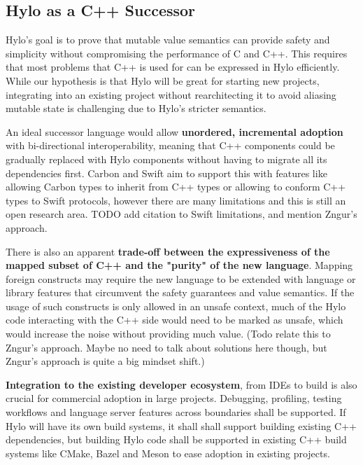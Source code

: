 \subsection{Hylo as a C++ Successor}
Hylo's goal is to prove that mutable value semantics can provide safety and simplicity without compromising the performance of C and C++\cite{hylo-lang}. This requires that most problems that C++ is used for can be expressed in Hylo efficiently. While our hypothesis is that Hylo will be great for starting new projects, integrating into an existing project without rearchitecting it to avoid aliasing mutable state is challenging  due to Hylo's stricter semantics.

An ideal successor language would allow \textbf{unordered, incremental adoption} with bi-directional interoperability\cite{requirements-for-cpp-successor-languages}, meaning that C++ components could be gradually replaced with Hylo components without having to migrate all its dependencies first. Carbon and Swift aim to support this with features like allowing Carbon types to inherit from C++ types\cite{carbon-interop-goals} or allowing to conform C++ types to Swift protocols\cite{swift-cpp-posthoc-conformance}, however there are many limitations and this is still an open research area. TODO add citation to Swift limitations, and mention Zngur's approach.

There is also an apparent \textbf{trade-off between the expressiveness of the mapped subset of C++ and the "purity" of the new language}. Mapping foreign constructs may require the new language to be extended with language or library features that circumvent the safety guarantees and value semantics. If the usage of such constructs is only allowed in an unsafe context, much of the Hylo code interacting with the C++ side would need to be marked as unsafe, which would increase the noise without providing much value. (Todo relate this to Zngur's approach. Maybe no need to talk about solutions here though, but Zngur's approach is quite a big mindset shift.)

\textbf{Integration to the existing developer ecosystem}, from IDEs to build is also crucial for commercial adoption in large projects. Debugging, profiling, testing workflows and language server features across boundaries shall be supported.\cite{requirements-for-cpp-successor-languages} If Hylo will have its own build systems, it shall shall support building existing C++ dependencies, but building Hylo code shall be supported in existing C++ build systems like CMake, Bazel and Meson to ease adoption in existing projects.

